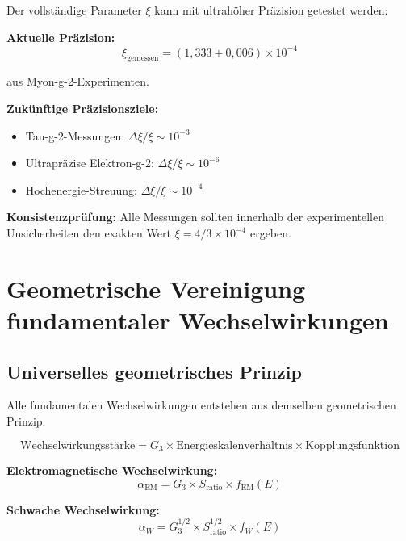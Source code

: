 \documentclass[12pt,a4paper]{report}
\begin{document}
	Der vollständige Parameter $\xi$ kann mit ultrahöher Präzision getestet werden:
	
	\textbf{Aktuelle Präzision:}
	\begin{equation}
		\xi_{\text{gemessen}} = (1,333 \pm 0,006) \times 10^{-4}
	\end{equation}
	
	aus Myon-g-2-Experimenten.
	
	\textbf{Zukünftige Präzisionsziele:}
	\begin{itemize}
		\item Tau-g-2-Messungen: $\Delta\xi/\xi \sim 10^{-3}$
		\item Ultrapräzise Elektron-g-2: $\Delta\xi/\xi \sim 10^{-6}$
		\item Hochenergie-Streuung: $\Delta\xi/\xi \sim 10^{-4}$
	\end{itemize}
	
	\textbf{Konsistenzprüfung:}
	Alle Messungen sollten innerhalb der experimentellen Unsicherheiten den exakten Wert $\xi = 4/3 \times 10^{-4}$ ergeben.
	
	\section{Geometrische Vereinigung fundamentaler Wechselwirkungen}
	\label{sec:geometric_unification}
	
	\subsection{Universelles geometrisches Prinzip}
	\label{subsec:universal_geometric_principle}
	
	Alle fundamentalen Wechselwirkungen entstehen aus demselben geometrischen Prinzip:
	
	\begin{equation}
		\text{Wechselwirkungsstärke} = G_3 \times \text{Energieskalenverhältnis} \times \text{Kopplungsfunktion}
	\end{equation}
	
	\textbf{Elektromagnetische Wechselwirkung:}
	\begin{equation}
		\alpha_{\text{EM}} = G_3 \times S_{\text{ratio}} \times f_{\text{EM}}(E)
	\end{equation}
	
	\textbf{Schwache Wechselwirkung:}
	\begin{equation}
		\alpha_W = G_3^{1/2} \times S_{\text{ratio}}^{1/2} \times f_W(E)
	\end{equation}
	
\end{document}
